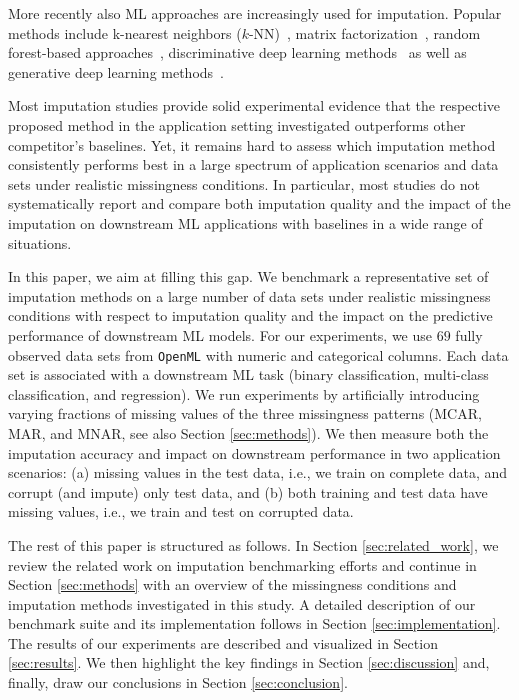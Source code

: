 \documentclass[utf8]{frontiersSCNS} %
\newcommand{\code}[1]{\texttt{#1}}
\begin{document}
More recently also ML approaches are increasingly used for imputation. Popular methods include k-nearest neighbors ($k$-NN)~\citep{Batista2003}, matrix factorization~\citep{Troyanskaya2001,Koren2009,Mazumder2010}, random forest-based approaches~\citep{Stekhoven2012}, discriminative deep learning methods~\citep{Biessmann2018a} as well as generative deep learning methods~\citep{GAIN, HIVAE, VAE_for_genomic_data, MisGAN, VIGAN}.

Most imputation studies provide solid experimental evidence that the respective proposed method in the application setting investigated outperforms other competitor's baselines. Yet, it remains hard to assess which imputation method consistently performs best in a large spectrum of application scenarios and data sets under realistic missingness conditions. In particular, most studies do not systematically report and compare both imputation quality and the impact of the imputation on downstream ML applications with baselines in a wide range of situations.

In this paper, we aim at filling this gap. We benchmark a representative set of imputation methods on a large number of data sets under realistic missingness conditions with respect to imputation quality and the impact on the predictive performance of downstream ML models. For our experiments, we use $69$ fully observed data sets from \code{OpenML} \citep{OpenML2013} with numeric and categorical columns. Each data set is associated with a downstream ML task (binary classification, multi-class classification, and regression). We run experiments by artificially introducing varying fractions of missing values of the three missingness patterns (MCAR, MAR, and MNAR, see also Section \ref{sec:methods}). We then measure both the imputation accuracy and impact on downstream performance in two application scenarios: (a) missing values in the test data, i.e., we train on complete data, and corrupt (and impute) only test data, and (b) both training and test data have missing values, i.e., we train and test on corrupted data.

The rest of this paper is structured as follows. In Section \ref{sec:related_work}, we review the related work on imputation benchmarking efforts and continue in Section \ref{sec:methods} with an overview of the missingness conditions and imputation methods investigated in this study. A detailed description of our benchmark suite and its implementation follows in Section \ref{sec:implementation}. The results of our experiments are described and visualized in Section \ref{sec:results}. We then highlight the key findings in Section \ref{sec:discussion} and, finally, draw our conclusions in Section \ref{sec:conclusion}.
\end{document}
